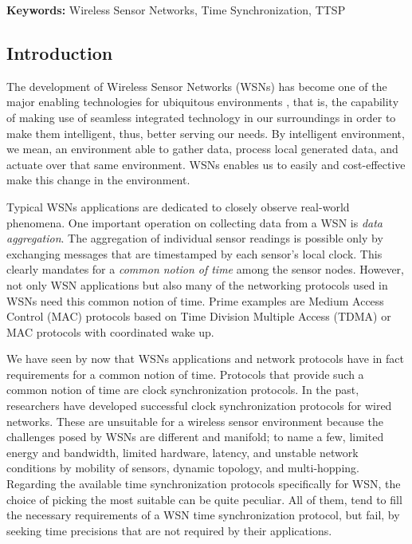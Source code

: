 \documentclass[11pt,a4]{article}
\begin{document}
\bigskip
\textbf{\Large Keywords:} Wireless Sensor Networks, Time Synchronization, TTSP
\bigskip
\begin{multicols}{2}
%
\section{Introduction}

The development of Wireless Sensor Networks (WSNs)  has become one of the major enabling technologies for ubiquitous environments \cite{karl05}, that is, the capability of making use of seamless integrated technology in our surroundings in order to make them intelligent, thus, better serving our needs. By intelligent environment, we mean, an environment able to gather data, process local generated data, and actuate over that same environment. WSNs enables us to easily and cost-effective make this change in the environment.

Typical WSNs applications are dedicated to closely observe real-world phenomena. One important operation on collecting data from a WSN is \textit{data aggregation}. The aggregation of individual sensor readings is possible only by exchanging messages that are timestamped by each sensor's local clock. This clearly mandates for a \textit{common notion of time} among the sensor nodes. However, not only WSN applications but also many of the networking protocols used in WSNs need this common notion of time. Prime examples are Medium Access Control (MAC) protocols based on Time Division Multiple Access (TDMA) or MAC protocols with coordinated wake up.

We have seen by now that WSNs applications and network protocols have in fact requirements for a common notion of time. Protocols that provide such a common notion of time are clock synchronization protocols. In the past, researchers have developed successful  clock synchronization protocols for wired networks. These are unsuitable for a wireless sensor environment because the challenges posed by WSNs are different and manifold; to name a few, limited energy and bandwidth, limited hardware, latency, and unstable network conditions by mobility of sensors, dynamic topology, and multi-hopping. Regarding the available time synchronization protocols specifically for WSN, the choice of picking the most suitable can be quite peculiar. All of them, tend to fill the necessary requirements of a WSN time synchronization protocol, but fail, by seeking time precisions that are not required by their applications.


\end{multicols}
\end{document}
